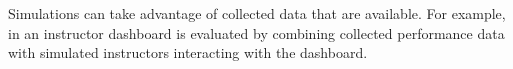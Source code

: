 

Simulations can take advantage of collected data that are available.
For example, in \cite{instructor-dashboard-realtime} an instructor dashboard is evaluated
by combining collected performance data %
with simulated instructors interacting with the dashboard.

%
%
%
